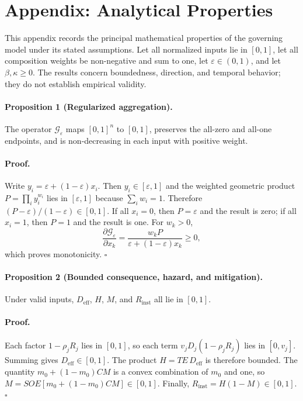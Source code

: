 \documentclass[11pt]{article}
\begin{document}
\section{Appendix: Analytical Properties}
\label{app:analytical-properties}

This appendix records the principal mathematical properties of the governing model
under its stated assumptions. Let all normalized inputs lie in $[0,1]$, let all
composition weights be non-negative and sum to one, let $\varepsilon\in(0,1)$, and
let $\beta,\kappa\geq0$. The results concern boundedness, direction, and temporal
behavior; they do not establish empirical validity.

\paragraph{Proposition 1 (Regularized aggregation).}
The operator $\mathcal{G}_{\varepsilon}$ maps $[0,1]^n$ to $[0,1]$, preserves the
all-zero and all-one endpoints, and is non-decreasing in each input with positive
weight.

\paragraph{Proof.}
Write $y_i=\varepsilon+(1-\varepsilon)x_i$. Then $y_i\in[\varepsilon,1]$ and the
weighted geometric product $P=\prod_i y_i^{w_i}$ lies in $[\varepsilon,1]$ because
$\sum_iw_i=1$. Therefore $(P-\varepsilon)/(1-\varepsilon)\in[0,1]$. If all
$x_i=0$, then $P=\varepsilon$ and the result is zero; if all $x_i=1$, then $P=1$
and the result is one. For $w_k>0$,
\begin{equation}
  \frac{\partial \mathcal{G}_{\varepsilon}}{\partial x_k}
  =\frac{w_kP}{\varepsilon+(1-\varepsilon)x_k}\geq0,
\end{equation}
which proves monotonicity. $\square$

\paragraph{Proposition 2 (Bounded consequence, hazard, and mitigation).}
Under valid inputs, $D_{\mathrm{eff}}$, $H$, $M$, and $R_{\mathrm{inst}}$ all lie in
$[0,1]$.

\paragraph{Proof.}
Each factor $1-\rho_jR_j$ lies in $[0,1]$, so each term
$v_jD_j(1-\rho_jR_j)$ lies in $[0,v_j]$. Summing gives
$D_{\mathrm{eff}}\in[0,1]$. The product $H=TE\,D_{\mathrm{eff}}$ is therefore
bounded. The quantity $m_0+(1-m_0)CM$ is a convex combination of $m_0$ and one,
so $M=SOE[m_0+(1-m_0)CM]\in[0,1]$. Finally,
$R_{\mathrm{inst}}=H(1-M)\in[0,1]$. $\square$
\end{document}
